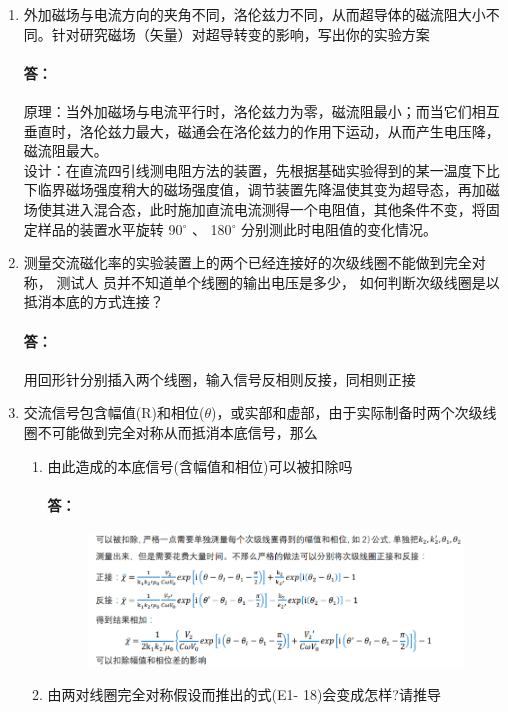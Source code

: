 \documentclass{ctexart}
\theoremstyle{ansstyle}
\begin{document}
\begin{enumerate}

    \item 外加磁场与电流方向的夹角不同，洛伦兹力不同，从而超导体的磁流阻大小不同。针对研究磁场（矢量）对超导转变的影响，写出你的实验方案
          \paragraph{答：}原理：当外加磁场与电流平行时，洛伦兹力为零，磁流阻最小；而当它们相互垂直时，洛伦兹力最大，磁通会在洛伦兹力的作用下运动，从而产生电压降，磁流阻最大。\\
          设计：在直流四引线测电阻方法的装置，先根据基础实验得到的某一温度下比下临界磁场强度稍大的磁场强度值，调节装置先降温使其变为超导态，再加磁场使其进入混合态，此时施加直流电流测得一个电阻值，其他条件不变，将固定样品的装置水平旋转 90$^\circ$ 、 180$^\circ$ 分别测此时电阻值的变化情况。
    \item 测量交流磁化率的实验装置上的两个已经连接好的次级线圈不能做到完全对称， 测试人
          员并不知道单个线圈的输出电压是多少， 如何判断次级线圈是以抵消本底的方式连接？
          \paragraph{答：}用回形针分别插入两个线圈，输入信号反相则反接，同相则正接
    \item 交流信号包含幅值(R)和相位($\theta$)，或实部和虚部，由于实际制备时两个次级线圈不可能做到完全对称从而抵消本底信号，那么
          \begin{enumerate}
              \item 由此造成的本底信号(含幅值和相位)可以被扣除吗
                    \paragraph{答：}\begin{figure}[H]
                        \includegraphics[width=0.8\linewidth]{./be/1}
                    \end{figure}
              \item 由两对线圈完全对称假设而推出的式(E1- 18)会变成怎样?请推导

\end{enumerate}
\end{enumerate}
\end{document}
